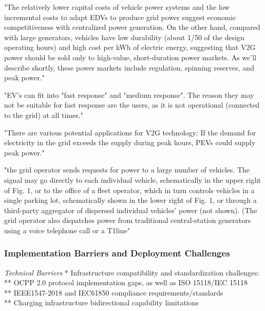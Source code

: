 "The relatively lower capital costs of vehicle power systems and the low incremental costs to adapt EDVs to produce grid power suggest economic competitiveness with centralized power generation. On the other hand, compared with large generators, vehicles have low durability (about 1/50 of the design operating hours) and high cost per kWh of electric energy, suggesting that V2G power should be sold only to high-value, short-duration power markets. As we’ll describe shortly, these power markets include regulation, spinning reserves, and peak power." \cite{kempton_vehicle--grid_2005}

"EV's can fit into "fast response" and "medium response". The reason they may not be suitable for fast response are the users, as it is not operational (connected to the grid) at all times." \cite{salman_review_2022}

"There are various potential applications for V2G technology: If the demand for electricity in the grid exceeds the supply during peak hours, PEVs could supply peak power." \cite{rashid_a_waraich_plug-hybrid_2013}

"the grid operator sends requests for power to a large number of vehicles. The signal may go directly to each individual vehicle, schematically in the upper right of Fig. 1, or to the office of a fleet operator, which in turn controls vehicles in a single parking lot, schematically shown in the lower right of Fig. 1, or through a third-party aggregator of dispersed individual vehicles’ power (not shown). (The grid operator also dispatches power from traditional central-station generators using a voice telephone call or a T1line" \cite{kempton_vehicle--grid_2005}



\subsubsection{Implementation Barriers and Deployment Challenges}


\emph{Technical Barriers}
* Infrastructure compatibility and standardization challenges: \\
** OCPP 2.0 protocol implementation gaps, as well as ISO 15118/IEC 15118 \\
** IEEE1547-2018 and IEC61850 compliance requirements/standards \\
** Charging infrastructure bidirectional capability limitations \\

